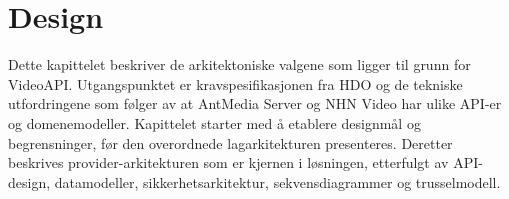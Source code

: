 \chapter{Design}
\label{ch:design}

Dette kapittelet beskriver de arkitektoniske valgene som ligger til grunn for VideoAPI. Utgangspunktet er kravspesifikasjonen fra HDO og de tekniske utfordringene som følger av at AntMedia Server og NHN Video har ulike API-er og domenemodeller. Kapittelet starter med å etablere designmål og begrensninger, før den overordnede lagarkitekturen presenteres. Deretter beskrives provider-arkitekturen som er kjernen i løsningen, etterfulgt av API-design, datamodeller, sikkerhetsarkitektur, sekvensdiagrammer og trusselmodell.









